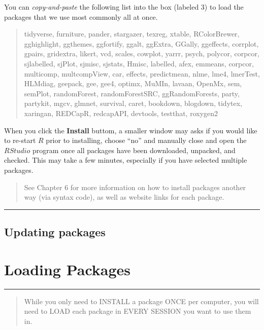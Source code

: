 \documentclass[]{book}
\theoremstyle{definition}
\theoremstyle{definition}
\theoremstyle{definition}
\theoremstyle{remark}
\begin{document}
You can \emph{copy-and-paste} the following list into the box (labeled
3) to load the packages that we use most commonly all at once.

\begin{quote}
tidyverse, furniture, pander, stargazer, texreg, xtable, RColorBrewer,
gghighlight, ggthemes, ggfortify, ggalt, ggExtra, GGally, ggeffects,
corrplot, gpairs, gridextra, likert, vcd, scales, cowplot, yarrr, psych,
polycor, corpcor, sjlabelled, sjPlot, sjmisc, sjstats, Hmisc, labelled,
afex, emmeans, corpcor, multicomp, multcompView, car, effects,
predictmean, nlme, lme4, lmerTest, HLMdiag, geepack, gee, gee4, optimx,
MuMIn, lavaan, OpenMx, sem, semPlot, randomForest, randomForestSRC,
ggRandomForests, party, partykit, mgcv, glmnet, survival, caret,
bookdown, blogdown, tidytex, xaringan, REDCapR, redcapAPI, devtools,
testthat, roxygen2
\end{quote}

When you click the \textbf{Install} buttom, a smaller window may asks if
you would like to re-start \(R\) prior to installing, choose ``no'' and
manually close and open the \(R Studio\) program once all packages have
been downloaded, unpacked, and checked. This may take a few minutes,
especially if you have selected multiple packages.

\begin{quote}
See Chapter 6 for more information on how to install packages another
way (via syntax code), as well as website links for each package.
\end{quote}

\begin{center}\rule{0.5\linewidth}{\linethickness}\end{center}

\section{Updating packages}\label{updating-packages}

\chapter{Loading Packages}\label{loading-packages}

\begin{center}\rule{0.5\linewidth}{\linethickness}\end{center}

\begin{quote}
While you only need to INSTALL a package ONCE per computer, you will
need to LOAD each package in EVERY SESSION you want to use them in.
\end{quote}
\end{document}
